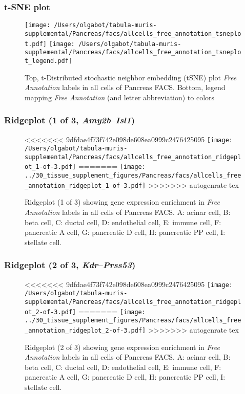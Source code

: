 \clearpage
\subsubsection{t-SNE plot}
\begin{figure}[h]
\centering
\texttt{[image: /Users/olgabot/tabula-muris-supplemental/Pancreas/facs/allcells\_free\_annotation\_tsneplot.pdf]}
\texttt{[image: /Users/olgabot/tabula-muris-supplemental/Pancreas/facs/allcells\_free\_annotation\_tsneplot\_legend.pdf]}
\caption{Top, t-Distributed stochastic neighbor embedding (tSNE) plot  \emph{Free Annotation} labels in all cells of Pancreas FACS. Bottom, legend mapping \emph{Free Annotation} (and letter abbreviation) to colors}
\end{figure}


\clearpage

\subsubsection{Ridgeplot (1 of 3, \emph{Amy2b}--\emph{Isl1})}
\begin{figure}[h]
\centering
<<<<<<< 9dfdae4f73f742e098de608ea0999c2476425095
\texttt{[image: /Users/olgabot/tabula-muris-supplemental/Pancreas/facs/allcells\_free\_annotation\_ridgeplot\_1-of-3.pdf]}
=======
\texttt{[image: ../30\_tissue\_supplement\_figures/Pancreas/facs/allcells\_free\_annotation\_ridgeplot\_1-of-3.pdf]}
>>>>>>> autogenrate tex

\caption{ Ridgeplot (1 of 3)  showing gene expression enrichment in \emph{Free Annotation} labels in all cells of Pancreas FACS. A: acinar cell, B: beta cell, C: ductal cell, D: endothelial cell, E: immune cell, F: pancreatic A cell, G: pancreatic D cell, H: pancreatic PP cell, I: stellate cell.}
\end{figure}


\clearpage

\subsubsection{Ridgeplot (2 of 3, \emph{Kdr}--\emph{Prss53})}
\begin{figure}[h]
\centering
<<<<<<< 9dfdae4f73f742e098de608ea0999c2476425095
\texttt{[image: /Users/olgabot/tabula-muris-supplemental/Pancreas/facs/allcells\_free\_annotation\_ridgeplot\_2-of-3.pdf]}
=======
\texttt{[image: ../30\_tissue\_supplement\_figures/Pancreas/facs/allcells\_free\_annotation\_ridgeplot\_2-of-3.pdf]}
>>>>>>> autogenrate tex

\caption{ Ridgeplot (2 of 3)  showing gene expression enrichment in \emph{Free Annotation} labels in all cells of Pancreas FACS. A: acinar cell, B: beta cell, C: ductal cell, D: endothelial cell, E: immune cell, F: pancreatic A cell, G: pancreatic D cell, H: pancreatic PP cell, I: stellate cell.}
\end{figure}


